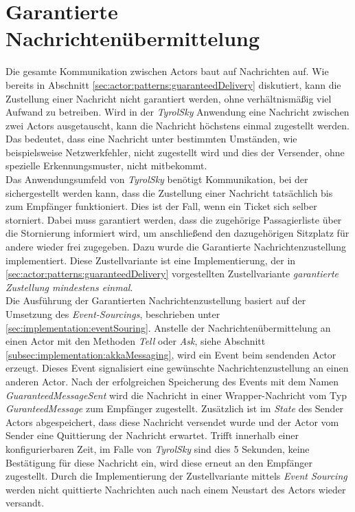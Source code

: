 \section{Garantierte Nachrichtenübermittelung}
Die gesamte Kommunikation zwischen Actors baut auf Nachrichten auf. Wie bereits in Abschnitt \ref{sec:actor:patterns:guaranteedDelivery} diskutiert, kann die Zustellung einer Nachricht nicht garantiert werden, ohne verhältnismäßig viel Aufwand zu betreiben. Wird in der \textit{TyrolSky} Anwendung eine Nachricht zwischen zwei Actors ausgetauscht, kann die Nachricht höchstens einmal zugestellt werden. Das bedeutet, dass eine Nachricht unter bestimmten Umständen, wie beispielsweise Netzwerkfehler, nicht zugestellt wird und dies der Versender, ohne spezielle Erkennungsmuster, nicht mitbekommt. \\
Das Anwendungsumfeld von \textit{TyrolSky} benötigt  Kommunikation, bei der sichergestellt werden kann, dass die Zustellung einer Nachricht tatsächlich bis zum Empfänger funktioniert. Dies ist der Fall, wenn ein Ticket sich selber storniert. Dabei muss garantiert werden, dass die zugehörige Passagierliste über die Stornierung informiert wird, um anschließend den dazugehörigen Sitzplatz für andere wieder frei zugegeben. Dazu wurde die Garantierte Nachrichtenzustellung implementiert. Diese Zustellvariante ist eine Implementierung, der in \ref{sec:actor:patterns:guaranteedDelivery} vorgestellten Zustellvariante \textit{garantierte Zustellung mindestens einmal}. \\
Die Ausführung der Garantierten Nachrichtenzustellung basiert auf der Umsetzung des \textit{Event-Sourcings}, beschrieben unter \ref{sec:implementation:eventSouring}.
Anstelle der Nachrichtenübermittelung an einen Actor mit den Methoden \textit{Tell} oder \textit{Ask}, siehe Abschnitt \ref{subsec:implementation:akkaMessaging}, wird ein Event beim sendenden Actor erzeugt. Dieses Event signalisiert eine gewünschte Nachrichtenzustellung an einen anderen Actor. Nach der erfolgreichen Speicherung des Events mit dem Namen \textit{GuaranteedMessageSent} wird die Nachricht in einer Wrapper-Nachricht vom Typ \textit{GuranteedMessage} zum Empfänger zugestellt. Zusätzlich ist im \textit{State} des Sender Actors abgespeichert, dass diese Nachricht versendet wurde und der Actor vom Sender eine Quittierung der Nachricht erwartet. Trifft innerhalb einer konfigurierbaren Zeit, im Falle von \textit{TyrolSky} sind dies 5 Sekunden, keine Bestätigung für diese Nachricht ein, wird diese erneut an den Empfänger zugestellt. Durch die Implementierung der Zustellvariante mittels \textit{Event Sourcing} werden nicht quittierte Nachrichten auch nach einem Neustart des Actors wieder versandt. \\
